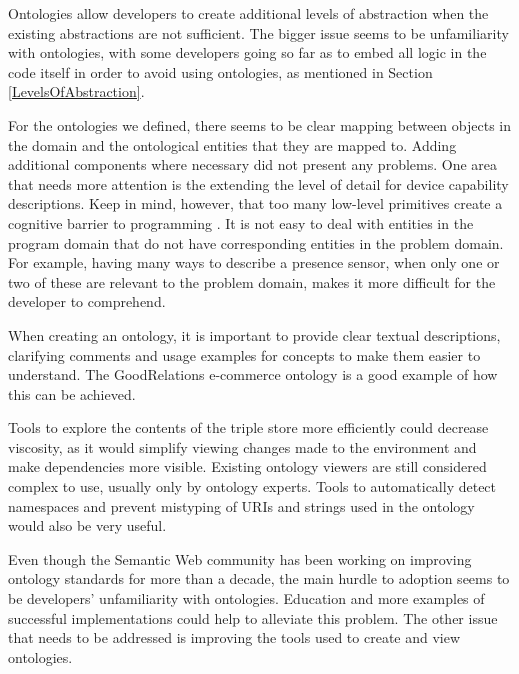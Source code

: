 Ontologies allow developers to create additional levels of abstraction when the existing abstractions are not sufficient. The bigger issue seems to be unfamiliarity with ontologies, with some developers going so far as to embed all logic in the code itself in order to avoid using ontologies, as mentioned in Section \ref{LevelsOfAbstraction}.

For the ontologies we defined, there seems to be clear mapping between objects in the domain and the ontological entities that they are mapped to. Adding additional components where necessary did not present any problems. One area that needs more attention is the extending the level of detail for device capability descriptions. Keep in mind, however, that too many low-level primitives create a cognitive barrier to programming \cite{Green1996}. It is not easy to deal with entities in the program domain that do not have corresponding entities in the problem domain. For example, having many ways to describe a presence sensor, when only one or two of these are relevant to the problem domain, makes it more difficult for the developer to comprehend.

When creating an ontology, it is important to provide clear textual descriptions, clarifying comments and usage examples for concepts to make them easier to understand. The GoodRelations e-commerce ontology is a good example of how this can be achieved.

Tools to explore the contents of the triple store more efficiently could decrease viscosity, as it would simplify viewing changes made to the environment and make dependencies more visible. Existing ontology viewers are still considered complex to use, usually only by ontology experts. Tools to automatically detect namespaces and prevent mistyping of \acp{URI} and strings used in the ontology would also be very useful.

Even though the Semantic Web community has been working on improving ontology standards for more than a decade, the main hurdle to adoption seems to be developers' unfamiliarity with ontologies. Education and more examples of successful implementations could help to alleviate this problem. The other issue that needs to be addressed is improving the tools used to create and view ontologies. 


